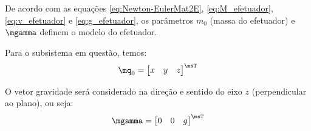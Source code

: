 \documentclass[]{politex}
\begin{document}
De acordo com as equações \eqref{eq:Newton-EulerMat2E}, \eqref{eq:M_efetuador}, \eqref{eq:v_efetuador} e \eqref{eq:g_efetuador}, os parâmetros $m_0$ (massa do efetuador) e $\mgamma$ definem o modelo do efetuador.




Para o subsistema em questão, temos:
\begin{equation}
\mq_0 = \begin{bmatrix}
x & y & z
\end{bmatrix}^\msT
\end{equation}

O vetor gravidade será considerado na direção e sentido do eixo $z$ (perpendicular ao plano), ou seja:
\begin{equation}
\mgamma = \begin{bmatrix}
0 & 0 & g
\end{bmatrix}^\msT
\end{equation}

\end{document}
